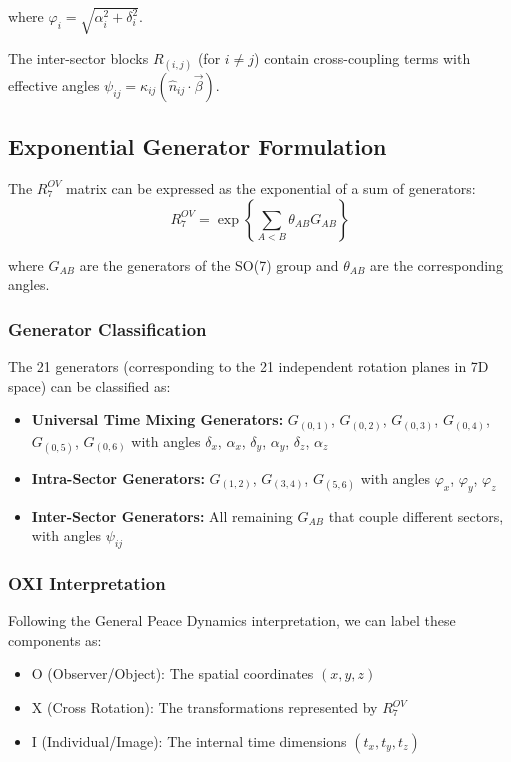 \documentclass{article}
\begin{document}
where $\varphi_i = \sqrt{\alpha_i^2 + \delta_i^2}$.

The inter-sector blocks $R_{(i,j)}$ (for $i \neq j$) contain cross-coupling terms with effective angles $\psi_{ij} = \kappa_{ij}(\hat{n}_{ij} \cdot \vec{\beta})$.

\subsection{Exponential Generator Formulation}

The $R^{OV}_7$ matrix can be expressed as the exponential of a sum of generators:
\begin{equation}
R^{OV}_7 = \exp\left\{\sum_{A<B} \theta_{AB} G_{AB}\right\}
\end{equation}

where $G_{AB}$ are the generators of the SO(7) group and $\theta_{AB}$ are the corresponding angles. 

\subsubsection{Generator Classification}
The 21 generators (corresponding to the 21 independent rotation planes in 7D space) can be classified as:

\begin{itemize}
\item \textbf{Universal Time Mixing Generators:} $G_{(0,1)}$, $G_{(0,2)}$, $G_{(0,3)}$, $G_{(0,4)}$, $G_{(0,5)}$, $G_{(0,6)}$ with angles $\delta_x$, $\alpha_x$, $\delta_y$, $\alpha_y$, $\delta_z$, $\alpha_z$

\item \textbf{Intra-Sector Generators:} $G_{(1,2)}$, $G_{(3,4)}$, $G_{(5,6)}$ with angles $\varphi_x$, $\varphi_y$, $\varphi_z$

\item \textbf{Inter-Sector Generators:} All remaining $G_{AB}$ that couple different sectors, with angles $\psi_{ij}$
\end{itemize}

\subsubsection{OXI Interpretation}
Following the General Peace Dynamics interpretation, we can label these components as:

\begin{itemize}
\item O (Observer/Object): The spatial coordinates $(x, y, z)$
\item X (Cross Rotation): The transformations represented by $R^{OV}_7$ 
\item I (Individual/Image): The internal time dimensions $(t_x, t_y, t_z)$
\end{itemize}
\end{document}

